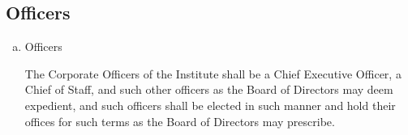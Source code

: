 \subsection{Officers}

\begin{enumerate}[(a)]
\item Officers

The Corporate Officers of the Institute shall be a Chief Executive Officer, a Chief of Staff, and such other officers as the Board of Directors may deem expedient, and such officers shall be elected in such manner and hold their offices for such terms as the Board of Directors may prescribe.
\end{enumerate}

